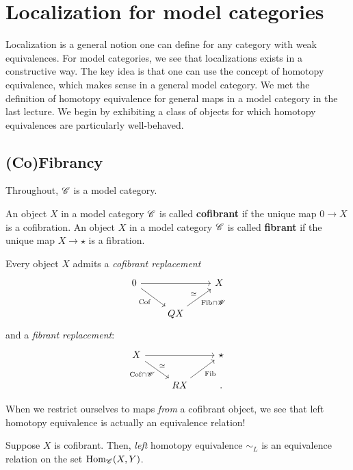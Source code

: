 \documentclass[11pt]{amsart}
\begin{document}
\section{Localization for model categories}

Localization is a general notion one can define for any category with weak equivalences. 
For model categories, we see that localizations exists in a constructive way. 
The key idea is that one can use the concept of homotopy equivalence, which makes sense in a general model category.
We met the definition of homotopy equivalence for general maps in a model category in the last lecture. 
We begin by exhibiting a class of objects for which homotopy equivalences are particularly well-behaved. 

\subsection{(Co)Fibrancy}

Throughout, $\mathscr C$ is a model category. 

\begin{dfn}
An object $X$ in a model category $\mathscr C$ is called {\bf cofibrant} if the unique map $0 \to X$ is a cofibration. 
An object $X$ in a model category $\mathscr C$ is called {\bf fibrant} if the unique map $X \to \star$ is a fibration. 
\end{dfn}

\begin{rmk}
Every object $X$ admits a {\em cofibrant replacement}
\[
\begin{tikzcd}
0 \ar[rr] \ar[dr, "{\rm Cof}"'] & & X \\
& Q X \ar[ur, "\simeq", "{\rm Fib} \cap \sW"'] & 
\end{tikzcd}
\] 
and a {\em fibrant replacement}:
\[
\begin{tikzcd}
X \ar[rr] \ar[dr, "\simeq", "{\rm Cof} \cap \sW"'] & & \star \\
& R X \ar[ur, "{\rm Fib}"'] & .
\end{tikzcd}
\] 
\end{rmk}

When we restrict ourselves to maps {\em from} a cofibrant object, we see that left homotopy equivalence is actually an equivalence relation!

\begin{prop}
Suppose $X$ is cofibrant. 
Then, {\em left} homotopy equivalence $\sim_L$ is an equivalence relation on the set ${\rm Hom}_{\mathscr C}(X,Y)$. 
\end{prop}
\end{document}
